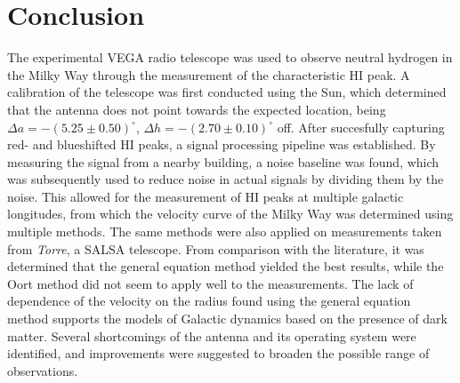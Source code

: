 \section{Conclusion}

The experimental VEGA radio telescope was used to observe neutral hydrogen in the Milky Way through the measurement of the characteristic HI peak. A calibration of the telescope was first conducted using the Sun, which determined that the antenna does not point towards the expected location, being $\Delta a = -(5.25 \pm 0.50)^\circ$, $\Delta h = -(2.70 \pm 0.10)^\circ$ off. After succesfully capturing red- and blueshifted HI peaks, a signal processing pipeline was established. By measuring the signal from a nearby building, a noise baseline was found, which was subsequently used to reduce noise in actual signals by dividing them by the noise. This allowed for the measurement of HI peaks at multiple galactic longitudes, from which the velocity curve of the Milky Way was determined using multiple methods. The same methods were also applied on measurements taken from \emph{Torre}, a SALSA telescope. From comparison with the literature, it was determined that the general equation method yielded the best results, while the Oort method did not seem to apply well to the measurements. The lack of dependence of the velocity on the radius found using the general equation method supports the models of Galactic dynamics based on the presence of dark matter.   
Several shortcomings of the antenna and its operating system were identified, and improvements were suggested to broaden the possible range of observations.
